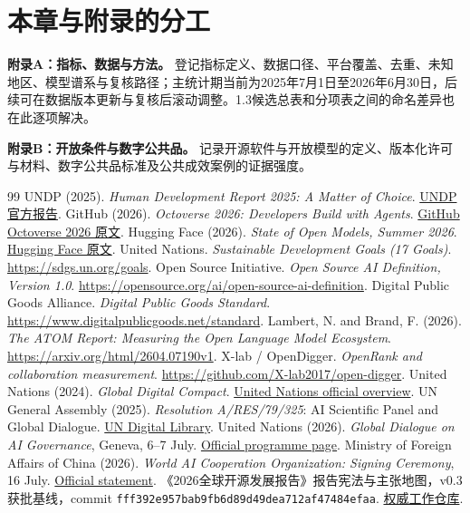 \documentclass[11pt,a4paper,openany]{ctexbook}
\begin{document}
\section*{本章与附录的分工}
\textbf{附录A：指标、数据与方法。} 登记指标定义、数据口径、平台覆盖、去重、未知地区、模型谱系与复核路径；主统计期当前为2025年7月1日至2026年6月30日，后续可在数据版本更新与复核后滚动调整。1.3候选总表和分项表之间的命名差异也在此逐项解决。

\textbf{附录B：开放条件与数字公共品。} 记录开源软件与开放模型的定义、版本化许可与材料、数字公共品标准及公共成效案例的证据强度。

\begin{thebibliography}{99}\small\setlength{\itemsep}{2pt}\setlength{\parskip}{0pt}
 UNDP (2025). \emph{Human Development Report 2025: A Matter of Choice}.  \href{https://hdr.undp.org/content/human-development-report-2025}{UNDP 官方报告}.
 GitHub (2026). \emph{Octoverse 2026: Developers Build with Agents}.  \href{https://github.blog/news-insights/octoverse/octoverse-commits-pushes-reach-new-highs-in-2026-as-developers-build-with-agents/}{GitHub Octoverse 2026 原文}.
 Hugging Face (2026). \emph{State of Open Models, Summer 2026}.  \href{https://huggingface.co/blog/state-of-open-models-summer-2026}{Hugging Face 原文}.
 United Nations. \emph{Sustainable Development Goals (17 Goals)}. \url{https://sdgs.un.org/goals}.
 Open Source Initiative. \emph{Open Source AI Definition, Version 1.0}. \url{https://opensource.org/ai/open-source-ai-definition}.
 Digital Public Goods Alliance. \emph{Digital Public Goods Standard}. \url{https://www.digitalpublicgoods.net/standard}.
 Lambert, N. and Brand, F. (2026). \emph{The ATOM Report: Measuring the Open Language Model Ecosystem}. \url{https://arxiv.org/html/2604.07190v1}.
 X-lab / OpenDigger. \emph{OpenRank and collaboration measurement}. \url{https://github.com/X-lab2017/open-digger}.
 United Nations (2024). \emph{Global Digital Compact}. \href{https://www.un.org/global-digital-compact/en}{United Nations official overview}.
 UN General Assembly (2025). \emph{Resolution A/RES/79/325}: AI Scientific Panel and Global Dialogue. \href{https://digitallibrary.un.org/record/4087699}{UN Digital Library}.
 United Nations (2026). \emph{Global Dialogue on AI Governance}, Geneva, 6--7 July. \href{https://www.un.org/global-dialogue-ai-governance/en}{Official programme page}.
 Ministry of Foreign Affairs of China (2026). \emph{World AI Cooperation Organization: Signing Ceremony}, 16 July. \href{https://www.mfa.gov.cn/eng/wjbzhd/202607/t20260717_11984747.html}{Official statement}.
 《2026全球开源发展报告》报告宪法与主张地图，v0.3 获批基线，commit \texttt{fff392e957bab9fb6d89d49dea712af47484efaa}. \href{https://github.com/will-ww/2026-GOSD-Report}{权威工作仓库}.
\end{thebibliography}
\end{document}
